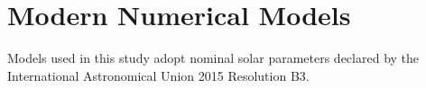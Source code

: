 \section{Modern Numerical Models}
Models used in this study adopt nominal solar parameters declared by the International Astronomical Union 2015 Resolution B3.